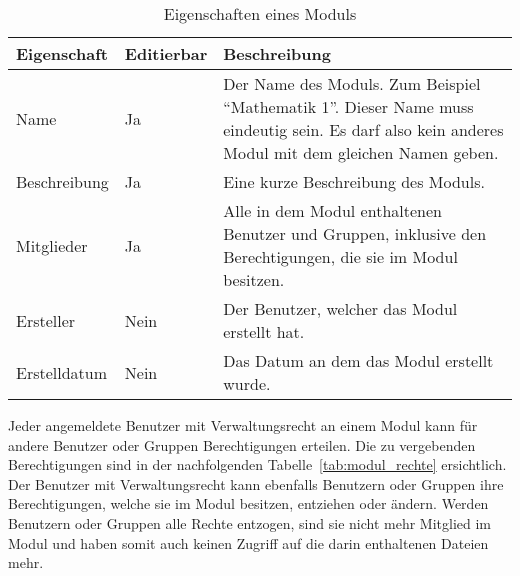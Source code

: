 \begin{table}[H]
\begin{tabularx}{\textwidth}{|l|l|X|} \hline
\textbf{Eigenschaft} &\textbf{Editierbar} & \textbf{Beschreibung} \\ \hline
Name				& Ja 	& Der Name des Moduls. Zum Beispiel “Mathematik 1”. Dieser Name muss eindeutig sein. Es darf also kein anderes Modul mit dem gleichen Namen geben.\\ \hline
Beschreibung		& Ja 	& Eine kurze Beschreibung des Moduls.\\ \hline
Mitglieder			& Ja 	& Alle in dem Modul enthaltenen Benutzer und Gruppen, inklusive den Berechtigungen, die sie im Modul besitzen.\\ \hline
Ersteller	 		& Nein 	& Der Benutzer, welcher das Modul erstellt hat.\\ \hline
Erstelldatum		& Nein 	& Das Datum an dem das Modul erstellt wurde.\\ \hline
\end{tabularx}
\caption{Eigenschaften eines Moduls}
\label{tab:modul_eigenschaften}
\end{table}

Jeder angemeldete Benutzer mit Verwaltungsrecht an einem Modul kann für andere Benutzer oder Gruppen Berechtigungen erteilen. Die zu vergebenden Berechtigungen sind in der nachfolgenden Tabelle~\ref{tab:modul_rechte} ersichtlich.
Der Benutzer mit Verwaltungsrecht kann ebenfalls Benutzern oder Gruppen ihre Berechtigungen, welche sie im Modul besitzen, entziehen oder ändern. Werden Benutzern oder Gruppen alle Rechte entzogen, sind sie nicht mehr Mitglied im Modul und haben somit auch keinen Zugriff auf die darin enthaltenen Dateien mehr.



